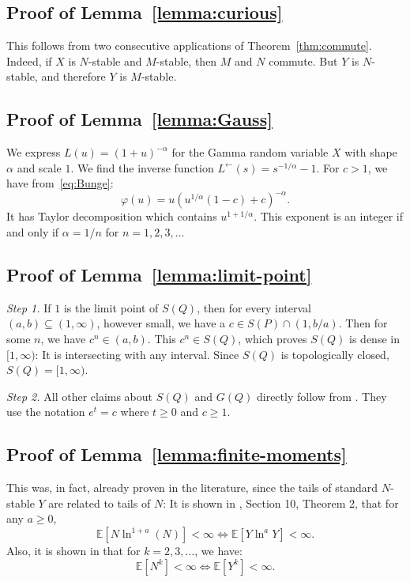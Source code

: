 \documentclass[12pt]{amsart}
\theoremstyle{remark}
\theoremstyle{definition}
\begin{document}
\subsection{Proof of Lemma~\ref{lemma:curious}} This follows from two consecutive applications of Theorem~\ref{thm:commute}. Indeed, if $X$ is $N$-stable and $M$-stable, then $M$ and $N$ commute. But $Y$ is $N$-stable, and therefore $Y$ is $M$-stable. 

\subsection{Proof of Lemma~\ref{lemma:Gauss}} We express $L(u) = (1 + u)^{-\alpha}$ for the Gamma random variable $X$ with shape $\alpha$ and scale $1$. We find the inverse function $L^{\leftarrow}(s) = s^{-1/\alpha} - 1$. For $c > 1$, we have from~\eqref{eq:Bunge}:
$$
\varphi(u) = u\left(u^{1/\alpha}(1-c) + c\right)^{-\alpha}.
$$
It has Taylor decomposition which contains $u^{1 + 1/\alpha}$. This exponent is an integer if and only if $\alpha = 1/n$ for $n = 1, 2, 3, \ldots$ 

\subsection{Proof of Lemma~\ref{lemma:limit-point}} {\it Step 1.} If $1$ is the limit point of $S(Q)$, then for every interval $(a, b) \subseteq (1, \infty)$, however small, we have a $c \in S(P) \cap (1, b/a)$. Then for some $n$, we have $c^n \in (a, b)$. This $c^n \in S(Q)$, which proves $S(Q)$ is dense in $[1, \infty)$: It is intersecting with any interval. Since $S(Q)$ is topologically closed, $S(Q) = [1, \infty)$. 

{\it Step 2.} All other claims about $S(Q)$ and $G(Q)$ directly follow from \cite[Proposition 1]{Bunge}. They use the notation $e^t = c$ where $t \ge 0$ and $c \ge 1$. 

\subsection{Proof of Lemma~\ref{lemma:finite-moments}} This was, in fact, already proven in the literature, since the tails of standard $N$-stable $Y$ are related to tails of $N$: It is shown in \cite[Chapter I]{AthreyaBook}, Section 10, Theorem 2, that for any $a \ge 0$, 
$$
\mathbb E[N\ln^{1 + a}(N)] < \infty \Leftrightarrow \mathbb E[Y\ln^a Y] < \infty.
$$
Also, it is shown in \cite[Theorem 0]{Bingham1974} that for $k = 2, 3, \ldots$, we have: 
$$
\mathbb E[N^k] < \infty \Leftrightarrow \mathbb E[Y^k] < \infty.
$$
\end{document}
